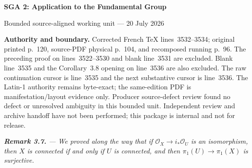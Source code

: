 \documentclass[10pt,a4paper]{article}
\begin{document}
\begin{center}
  {\Large\bfseries SGA 2: Application to the Fundamental Group}\par\smallskip
  {\large Bounded source-aligned working unit --- 20 July 2026}
\end{center}

\noindent\colorbox{softgray}{\parbox{0.95\linewidth}{\footnotesize\textbf{Authority and boundary.}
Corrected French TeX lines~3532--3534; original printed p.~120,
source-PDF physical p.~104, and recomposed running p.~96. The preceding proof
on lines~3522--3530 and blank line~3531 are excluded. Blank line~3535 and the
Corollary~3.8 opening on line~3536 are also excluded. The raw continuation
cursor is line~3535 and the next substantive cursor is line~3536. The Latin-1
authority remains byte-exact; the same-edition PDF is manifestation/layout
evidence only. Producer source-defect review found no defect or unresolved
ambiguity in this bounded unit. Independent review and archive handoff have
not been performed; this package is internal and not for release.}}

\medskip
{\itshape
\noindent\textbf{Remark 3.7.} --- We proved along the way that if
$\mathcal O_X\to i_*\mathcal O_U$ is an isomorphism, then $X$ is connected if
and only if $U$ is connected, and then $\pi_1(U)\to\pi_1(X)$ is surjective.
}
\end{document}
